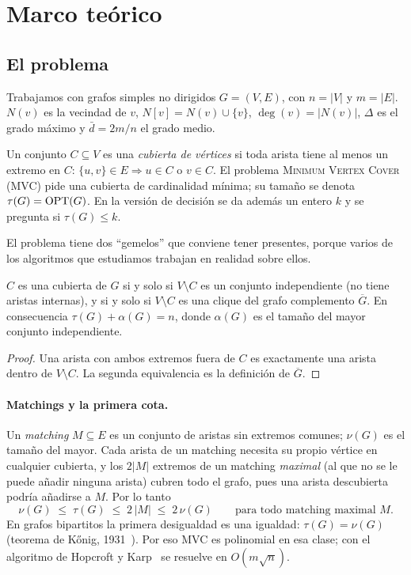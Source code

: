 \section{Marco teórico}\label{sec:marco}

\subsection{El problema}\label{sec:def}
Trabajamos con grafos simples no dirigidos $G=(V,E)$, con $n=|V|$ y $m=|E|$. $N(v)$ es la vecindad de $v$, $N[v]=N(v)\cup\{v\}$, $\deg(v)=|N(v)|$, $\Delta$ es el grado máximo y $\bar d=2m/n$ el grado medio.

\begin{definition}
Un conjunto $C\subseteq V$ es una \emph{cubierta de vértices} si toda arista tiene al menos un extremo en $C$: $\{u,v\}\in E\Rightarrow u\in C$ o $v\in C$. El problema \textsc{Minimum Vertex Cover} (MVC) pide una cubierta de cardinalidad mínima; su tamaño se denota $\tau(G)=\mathrm{OPT}(G)$. En la versión de decisión se da además un entero $k$ y se pregunta si $\tau(G)\le k$.
\end{definition}

El problema tiene dos ``gemelos'' que conviene tener presentes, porque varios de los algoritmos que estudiamos trabajan en realidad sobre ellos.

\begin{proposition}\label{prop:gallai}
$C$ es una cubierta de $G$ si y solo si $V\setminus C$ es un conjunto independiente (no tiene aristas internas), y si y solo si $V\setminus C$ es una clique del grafo complemento $\overline G$. En consecuencia $\tau(G)+\alpha(G)=n$, donde $\alpha(G)$ es el tamaño del mayor conjunto independiente.
\end{proposition}
\begin{proof}
Una arista con ambos extremos fuera de $C$ es exactamente una arista dentro de $V\setminus C$. La segunda equivalencia es la definición de $\overline G$.
\end{proof}

\paragraph{Matchings y la primera cota.} Un \emph{matching} $M\subseteq E$ es un conjunto de aristas sin extremos comunes; $\nu(G)$ es el tamaño del mayor. Cada arista de un matching necesita su propio vértice en cualquier cubierta, y los $2|M|$ extremos de un matching \emph{maximal} (al que no se le puede añadir ninguna arista) cubren todo el grafo, pues una arista descubierta podría añadirse a $M$. Por lo tanto
\begin{equation}\label{eq:matching}
\nu(G)\;\le\;\tau(G)\;\le\;2\,|M|\;\le\;2\,\nu(G)\qquad\text{para todo matching maximal }M.
\end{equation}
En grafos bipartitos la primera desigualdad es una igualdad: $\tau(G)=\nu(G)$ (teorema de Kőnig, 1931~\citep{konig1931}). Por eso MVC es polinomial en esa clase; con el algoritmo de Hopcroft y Karp~\citep{hopcroft1973} se resuelve en $O(m\sqrt n)$.

